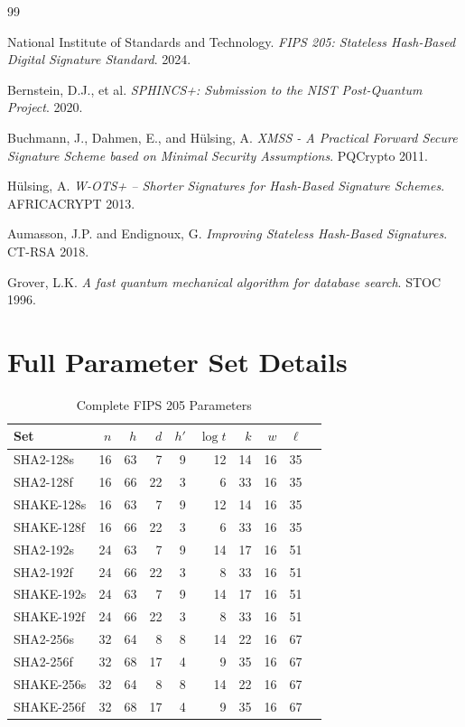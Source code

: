 \documentclass[11pt,a4paper]{article}
\begin{document}

\begin{thebibliography}{99}

National Institute of Standards and Technology.
\textit{FIPS 205: Stateless Hash-Based Digital Signature Standard}.
2024.

Bernstein, D.J., et al.
\textit{SPHINCS+: Submission to the NIST Post-Quantum Project}.
2020.

Buchmann, J., Dahmen, E., and Hülsing, A.
\textit{XMSS - A Practical Forward Secure Signature Scheme based on Minimal Security Assumptions}.
PQCrypto 2011.

Hülsing, A.
\textit{W-OTS+ -- Shorter Signatures for Hash-Based Signature Schemes}.
AFRICACRYPT 2013.

Aumasson, J.P. and Endignoux, G.
\textit{Improving Stateless Hash-Based Signatures}.
CT-RSA 2018.

Grover, L.K.
\textit{A fast quantum mechanical algorithm for database search}.
STOC 1996.

\end{thebibliography}

\appendix

\section{Full Parameter Set Details}

\begin{table}[htbp]
\centering
\caption{Complete FIPS 205 Parameters}
\small
\begin{tabular}{@{}lrrrrrrrrr@{}}
\toprule
Set & $n$ & $h$ & $d$ & $h'$ & $\log t$ & $k$ & $w$ & $\ell$ \\
\midrule
SHA2-128s & 16 & 63 & 7 & 9 & 12 & 14 & 16 & 35 \\
SHA2-128f & 16 & 66 & 22 & 3 & 6 & 33 & 16 & 35 \\
SHAKE-128s & 16 & 63 & 7 & 9 & 12 & 14 & 16 & 35 \\
SHAKE-128f & 16 & 66 & 22 & 3 & 6 & 33 & 16 & 35 \\
SHA2-192s & 24 & 63 & 7 & 9 & 14 & 17 & 16 & 51 \\
SHA2-192f & 24 & 66 & 22 & 3 & 8 & 33 & 16 & 51 \\
SHAKE-192s & 24 & 63 & 7 & 9 & 14 & 17 & 16 & 51 \\
SHAKE-192f & 24 & 66 & 22 & 3 & 8 & 33 & 16 & 51 \\
SHA2-256s & 32 & 64 & 8 & 8 & 14 & 22 & 16 & 67 \\
SHA2-256f & 32 & 68 & 17 & 4 & 9 & 35 & 16 & 67 \\
SHAKE-256s & 32 & 64 & 8 & 8 & 14 & 22 & 16 & 67 \\
SHAKE-256f & 32 & 68 & 17 & 4 & 9 & 35 & 16 & 67 \\
\bottomrule
\end{tabular}
\end{table}
\end{document}
